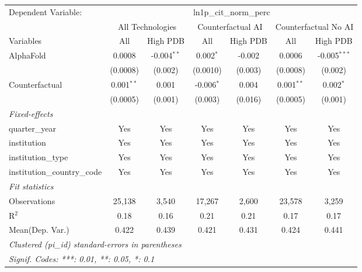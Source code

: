 \begingroup
\centering
\begin{tabular}{lcccccc}
   \tabularnewline \midrule \midrule
   Dependent Variable: & \multicolumn{6}{c}{ln1p\_cit\_norm\_perc}\\
 & \multicolumn{2}{c}{All Technologies} & \multicolumn{2}{c}{Counterfactual AI} & \multicolumn{2}{c}{Counterfactual No AI} \\
\cmidrule(lr){1-1}\cmidrule(lr){2-3} \cmidrule(lr){4-5} \cmidrule(lr){6-7}
Variables & \multicolumn{1}{c}{All} & \multicolumn{1}{c}{High PDB} & \multicolumn{1}{c}{All} & \multicolumn{1}{c}{High PDB} & \multicolumn{1}{c}{All} & \multicolumn{1}{c}{High PDB} \\
\cmidrule(lr){1-1}\cmidrule(lr){2-2} \cmidrule(lr){3-3} \cmidrule(lr){4-4} \cmidrule(lr){5-5} \cmidrule(lr){6-6} \cmidrule(lr){7-7}
   AlphaFold                    & 0.0008       & -0.004$^{**}$ & 0.002$^{*}$  & -0.002  & 0.0006       & -0.005$^{***}$\\   
                                & (0.0008)     & (0.002)       & (0.0010)     & (0.003) & (0.0008)     & (0.002)\\   
   Counterfactual               & 0.001$^{**}$ & 0.001         & -0.006$^{*}$ & 0.004   & 0.001$^{**}$ & 0.002$^{*}$\\   
                                & (0.0005)     & (0.001)       & (0.003)      & (0.016) & (0.0005)     & (0.001)\\   
   \midrule
   \emph{Fixed-effects}\\
   quarter\_year                & Yes          & Yes           & Yes          & Yes     & Yes          & Yes\\  
   institution                  & Yes          & Yes           & Yes          & Yes     & Yes          & Yes\\  
   institution\_type            & Yes          & Yes           & Yes          & Yes     & Yes          & Yes\\  
   institution\_country\_code   & Yes          & Yes           & Yes          & Yes     & Yes          & Yes\\  
   \midrule
   \emph{Fit statistics}\\
   Observations                 & 25,138       & 3,540         & 17,267       & 2,600   & 23,578       & 3,259\\  
   R$^2$                        & 0.18         & 0.16          & 0.21         & 0.21    & 0.17         & 0.17\\  
Mean(Dep. Var.) & 0.422 & 0.439 & 0.421 & 0.431 & 0.424 & 0.441 \\
   \midrule \midrule
   \multicolumn{7}{l}{\emph{Clustered (pi\_id) standard-errors in parentheses}}\\
   \multicolumn{7}{l}{\emph{Signif. Codes: ***: 0.01, **: 0.05, *: 0.1}}\\
\end{tabular}
\par\endgroup
